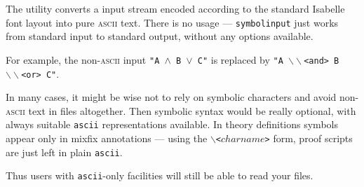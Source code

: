 The  utility converts a input stream encoded
according to the standard Isabelle font layout into pure
\textsc{ascii} text. There is no usage --- \texttt{symbolinput} just
works from standard input to standard output, without any options
available.

\medskip For example, the non-\textsc{ascii} input \texttt{"A $\land$
  B $\lor$ C"} is replaced by \texttt{"A $\backslash\backslash$<and> B
  $\backslash\backslash$<or> C"}.

\medskip In many cases, it might be wise not to rely on symbolic
characters and avoid non-\textsc{ascii} text in files altogether. Then
symbolic syntax would be really optional, with always suitable
\texttt{ascii} representations available. In theory definitions
symbols appear only in mixfix annotations --- using the
\texttt{$\backslash$<$charname$>} form, proof scripts are just left in
plain \texttt{ascii}.

Thus users with \texttt{ascii}-only facilities will still be able to
read your files.


%
